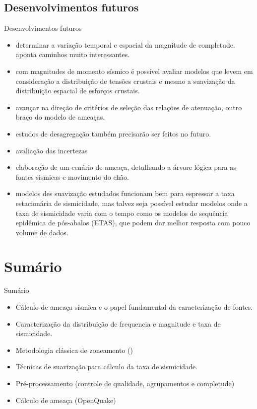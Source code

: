 \documentclass[ucs,8pt]{beamer}
\begin{document}
\subsection{Desenvolvimentos futuros}
\begin{frame}{Desenvolvimentos futuros}
\begin{itemize}
	\item determinar a variação temporal e espacial da magnitude de completude. \citet{vorobieva_2013} aponta caminhos muito
	interessantes.
	\item com magnitudes de momento sísmico é possível avaliar modelos que levem em consideração a distribuição
	de tensões crustais e mesmo a suavização da distribuição espacial de esforços crustais.
	\item avançar na direção de critérios de seleção das relações de atenuação, outro braço do modelo de ameaças.
	\item estudos de desagregação \citep{pagani_2007} também precisarão ser feitos no futuro.
	\item avaliação das incertezas
	\item elaboração de um cenário de ameaça, detalhando a árvore lógica para as fontes sísmicas e movimento do chão. 
	\item modelos des suavização estudados funcionam bem para espressar a taxa estacionária de sismicidade, mas
	talvez seja possível estudar modelos onde a taxa de sismicidade varia com o tempo como os modelos de sequência epidêmica
	de pós-abalos (ETAS), que podem dar melhor resposta com pouco volume de dados.
	\end{itemize}
\end{frame}


\section*{Sumário}

\begin{frame}{Sumário}
	\begin{itemize}
	  \item Cálculo de ameaça sísmica e o papel fundamental da caracterização de fontes.
	  \item Caracterização da distribuição de frequencia e magnitude e taxa de sismicidade.
	  \item Metodologia clássica de zoneamento (\citet{cornell_1968, mcguire_1976})
	  \item Técnicas de suavização para cálculo da taxa de sismicidade.
	  \item Pré-processamento (controle de qualidade, agrupamentos e completude)
	  \item Cálculo de ameaça (OpenQuake)
	\end{itemize}
\end{frame}
\end{document}
